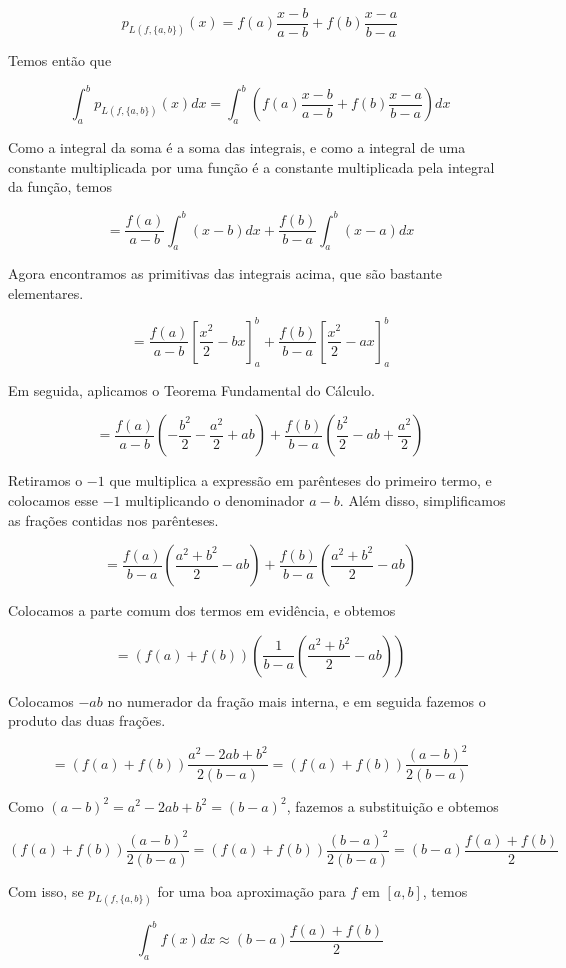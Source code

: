 \documentclass[]{article}
\numberwithin{equation}{section}
\begin{document}
$$
p_{L(f, \{a, b\})}(x) = f(a) \frac{x - b}{a - b} + f(b) \frac{x - a}{b - a}
$$

Temos então que

$$
\int_{a}^{b} p_{L(f, \{a, b\})}(x) dx = \int_{a}^{b} \left(f(a) \frac{x - b}{a - b} + f(b) \frac{x - a}{b - a}\right) dx
$$

Como a integral da soma é a soma das integrais, e como a integral de
uma constante multiplicada por uma função é a constante multiplicada
pela integral da função, temos

$$
= \frac{f(a)}{a - b} \int_{a}^{b} (x - b) dx + \frac{f(b)}{b - a} \int_{a}^{b} (x - a) dx
$$

Agora encontramos as primitivas das integrais acima, que são bastante
elementares.

$$
= \frac{f(a)}{a - b} \left[\frac{x^2}{2} - bx\right]_a^b + \frac{f(b)}{b - a} \left[\frac{x^2}{2} - ax\right]_a^b
$$

Em seguida, aplicamos o Teorema Fundamental do Cálculo.

$$
= \frac{f(a)}{a - b} \left(-\frac{b^2}{2} - \frac{a^2}{2} + ab\right) + \frac{f(b)}{b - a} \left(\frac{b^2}{2} - ab + \frac{a^2}{2}\right)
$$

Retiramos o $-1$ que multiplica a expressão em parênteses do primeiro
termo, e colocamos esse $-1$ multiplicando o denominador $a - b$.
Além disso, simplificamos as frações contidas nos parênteses.

$$
= \frac{f(a)}{b - a} \left(\frac{a^2 + b^2}{2} - ab\right) + \frac{f(b)}{b - a} \left(\frac{a^2 + b^2}{2} - ab\right)
$$

Colocamos a parte comum dos termos em evidência, e obtemos

$$
= (f(a) + f(b))\left(\frac{1}{b - a} \left(\frac{a^2 + b^2}{2} - ab\right)\right)
$$

Colocamos $-ab$ no numerador da fração mais interna, e em seguida
fazemos o produto das duas frações.

$$
= (f(a) + f(b)) \frac{a^2 - 2ab + b^2}{2(b - a)} = (f(a) + f(b)) \frac{(a - b)^2}{2(b - a)}
$$

Como $(a - b)^2 = a^2 - 2ab + b^2 = (b - a)^2$, fazemos a substituição e obtemos

$$
(f(a) + f(b)) \frac{(a - b)^2}{2(b - a)} = (f(a) + f(b)) \frac{(b - a)^2}{2(b - a)} = (b - a) \frac{f(a) + f(b)}{2}
$$

Com isso, se $p_{L(f, \{a, b\})}$ for uma boa aproximação para $f$ em $[a, b]$, temos

$$
\int_{a}^{b} f(x) dx \approx (b - a) \frac{f(a) + f(b)}{2}
$$
\end{document}
